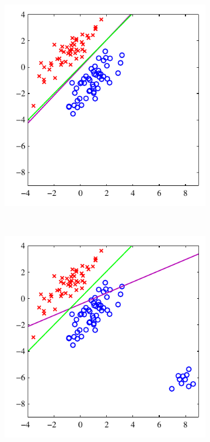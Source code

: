 \begin{figure}
	\begin{subfigure}[b]{0.45\textwidth}
		\includegraphics[width=\textwidth]{./lecture7/Figure44a.pdf}
	\end{subfigure}
	~
	\begin{subfigure}[b]{0.45\textwidth}
		\includegraphics[width=\textwidth]{./lecture7/Figure44b.pdf}
	\end{subfigure}	
\end{figure}


